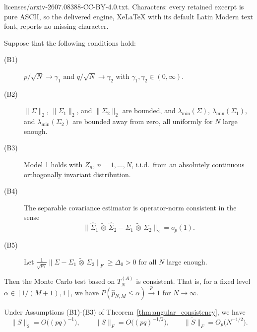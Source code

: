 \documentclass[10pt,a4paper]{amsart}
\newcommand{\ot}{\,\tilde\otimes\,}
\begin{document}
licenses/arxiv-2607.08388-CC-BY-4.0.txt. Characters: every retained excerpt is pure ASCII, so the delivered engine, XeLaTeX with its default Latin Modern text font, reports no missing character.
\begin{theorem}\label{thm:angular_consistency}
    Suppose that the following conditions hold:
    \begin{description}
    \item[(B1)] \(p/\sqrt N\to \gamma_1\) and \(q/\sqrt N\to \gamma_2\) with
	\(\gamma_1,\gamma_2\in(0,\infty)\).
	\item[(B2)] \(\|\Sigma\|_{2}\), \(\|\Sigma_{1}\|_{2}\), and
	\(\|\Sigma_{2}\|_{2}\) are bounded, and
	\(\lambda_{\min}(\Sigma)\), \(\lambda_{\min}(\Sigma_{1})\), and
	\(\lambda_{\min}(\Sigma_{2})\) are bounded away from zero, all uniformly for
	\(N\) large enough.
	\item[(B3)] Model 1 holds with $Z_n$, $n=1,\dots,N$, i.i.d.~from an absolutely continuous orthogonally invariant distribution.
	\item[(B4)] The separable covariance estimator is operator-norm consistent in the sense
	\[
	\|\widehat\Sigma_{1}\ot \widehat\Sigma_{2} -\Sigma_{1}\ot \Sigma_{2}\|_{2}
	=o_p(1).
	\]
	\item[(B5)] Let $\frac{1}{\sqrt{pq}}
	\|\Sigma-\Sigma_{1}\ot \Sigma_{2}\|_F
	\ge \Delta_0 > 0 $
	for all $N$ large enough.
    \end{description}
    Then the Monte Carlo test based on $T_N^{(A)}$ is consistent. That is, for a fixed level $\alpha \in [1/(M+1), 1]$, we have $P(\widehat{p}_{N,M} \leq \alpha) \stackrel{p}{\to} 1$ for $N \to \infty$. 
\end{theorem}

\begin{lemma}\label{lem:rates}
    Under Assumptions (B1)-(B3) of Theorem~\ref{thm:angular_consistency}, we have
\[
	\|S\|_{2}=O\big((pq)^{-1}\big),
	\qquad
	\|S\|_F=O\big((pq)^{-1/2}\big),
	\qquad
	\|\widetilde S\|_F=O_p\big(N^{-1/2}\big).
\]
\end{lemma}
\end{document}
